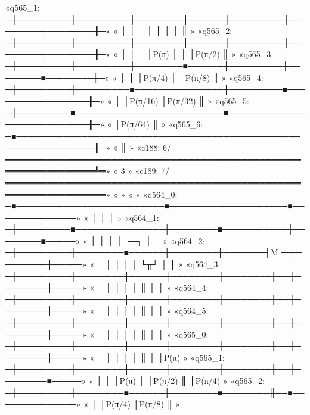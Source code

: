 «q565_1: ─┼─────────┼─────────┼────────┼──────┼─────────┼────────┼────────╫─»
«         │         │         │        │      │         │        │        ║ »
«q565_2: ─┼─────────┼─────────┼────────┼──────┼─────────┼────────┼────────╫─»
«         │         │         │        │P(π)  │         │        │P(π/2)  ║ »
«q565_3: ─┼─────────┼─────────┼────────■──────┼─────────┼────────■────────╫─»
«         │         │         │P(π/4)         │         │P(π/8)           ║ »
«q565_4: ─┼─────────┼─────────■───────────────┼─────────■─────────────────╫─»
«         │         │P(π/16)                  │P(π/32)                    ║ »
«q565_5: ─┼─────────■─────────────────────────■───────────────────────────╫─»
«         │P(π/64)                                                        ║ »
«q565_6: ─■───────────────────────────────────────────────────────────────╫─»
«                                                                         ║ »
«c188: 6/═════════════════════════════════════════════════════════════════╩═»
«                                                                         3 »
«c189: 7/═══════════════════════════════════════════════════════════════════»
«                                                                           »
«                                                                       »
«q564_0: ─■─────────────────────────■────────────────────■──────────────»
«         │                         │                    │              »
«q564_1: ─┼─────────■───────────────┼────────■───────────┼────────■─────»
«         │         │               │        │       ┌─┐ │        │     »
«q564_2: ─┼─────────┼────────■──────┼────────┼───────┤M├─┼────────┼─────»
«         │         │        │      │        │       └╥┘ │        │     »
«q564_3: ─┼─────────┼────────┼──────┼────────┼────────╫──┼────────┼─────»
«         │         │        │      │        │        ║  │        │     »
«q564_4: ─┼─────────┼────────┼──────┼────────┼────────╫──┼────────┼─────»
«         │         │        │      │        │        ║  │        │     »
«q564_5: ─┼─────────┼────────┼──────┼────────┼────────╫──┼────────┼─────»
«         │         │        │      │        │        ║  │        │     »
«q565_0: ─┼─────────┼────────┼──────┼────────┼────────╫──┼────────┼─────»
«         │         │        │      │        │        ║  │        │P(π) »
«q565_1: ─┼─────────┼────────┼──────┼────────┼────────╫──┼────────■─────»
«         │         │        │P(π)  │        │P(π/2)  ║  │P(π/4)        »
«q565_2: ─┼─────────┼────────■──────┼────────■────────╫──■──────────────»
«         │         │P(π/4)         │P(π/8)           ║                 »
